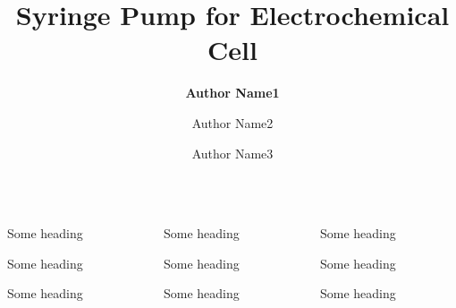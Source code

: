\documentclass[final,t]{beamer}
\title[]{\huge Syringe Pump for Electrochemical Cell}
\author[]{\large \textbf{Author Name1} \and Author Name2 \and Author Name3}
\institute[]{\Large Dept of XYZ, ABC Institute}
\date{}
\begin{document}
\begin{frame}
\maketitle
\begin{columns}[t]
  \begin{column}{.32\linewidth}
 
  \begin{block}{Some heading}
  \lipsum[1]
  \end{block}     

  \begin{block}{Some heading}
  \lipsum[1]
  \end{block}
  
  \begin{block}{Some heading}
  \lipsum[1]
  \end{block}
  
  
  \end{column}



  \begin{column}{.32\linewidth}
 
  \begin{block}{Some heading}
  \lipsum[1]
  \end{block}     

  \begin{block}{Some heading}
  \lipsum[1]
  \end{block}
  
  \begin{block}{Some heading}
  \lipsum[1]
  \end{block}
  
  
  \end{column}

  

  \begin{column}{.32\linewidth}
 
  \begin{block}{Some heading}
  \lipsum[1]
  \end{block}     

  \begin{block}{Some heading}
  \lipsum[1]
  \end{block}
  
  \begin{block}{Some heading}
  \lipsum[1]
  \end{block}
  
  
  \end{column}
  \end{columns}
    
\end{frame}
\end{document}
